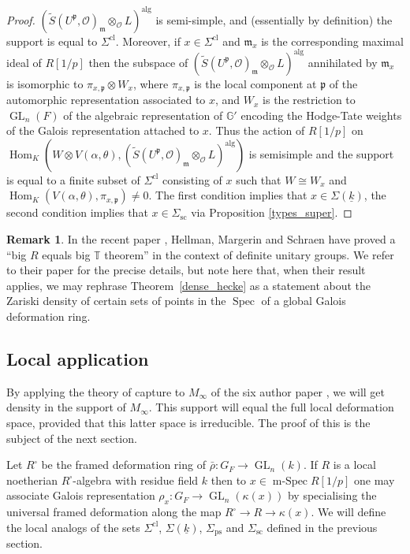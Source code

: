 \documentclass[JEP,XML,SOM,Unicode,NoEqCountersInSection]{cedram}
\let\mathcal\mathscr
\newcommand{\ssquare}{{\scriptscriptstyle\square}}
\newcommand{\rps}{\mathrm{ps}}
\newcommand{\rsc}{\mathrm{sc}}
\theoremstyle{definition}
\newtheorem{remark}[prop]{Remark}
\DeclareMathOperator{\Hom}{Hom}
\DeclareMathOperator{\GL}{GL}
\DeclareMathOperator{\Spec}{Spec}
\DeclareMathOperator{\mSpec}{m-Spec}
\newcommand{\mm}{\mathfrak m}
\newcommand{\cO}{\mathcal{O}}
\newcommand{\TT}{\mathbb T}
\newcommand{\pp}{\mathfrak p}
\newcommand{\alg}{\mathrm{alg}}
\newcommand{\rhobar}{\bar{\rho}}
\begin{document}
\begin{proof}
$(\tilde{S}(U^{\pp}, \cO)_{\mm}\otimes_{\cO} L)^\alg$ is semi-simple, and (essentially by definition) the support is equal to $\Sigma^{\mathrm{cl}}$.
Moreover, if $x\in \Sigma^{\mathrm{cl}}$ and $\mm_x$ is the corresponding maximal ideal of $R[1/p]$ then the subspace of $(\tilde{S}(U^{\pp}, \cO)_{\mm}\otimes_{\cO} L)^\alg$ annihilated by $\mm_x$ is isomorphic to $\pi_{x,\pp} \otimes W_x$, where
$\pi_{x,\pp}$ is the local component at $\pp$ of the automorphic representation associated to $x$, and $W_x$ is the restriction to $\GL_n(F)$ of the algebraic representation of $\mathbb{G}'$ encoding the Hodge-Tate weights of the Galois
representation attached to $x$. Thus the action of $R[1/p]$ on
$\Hom_K( W\otimes V(\alpha, \theta), (\tilde{S}(U^{\pp}, \cO)_{\mm}\otimes_{\cO} L)^\alg)$ is semisimple and the support is equal to a finite subset of $\Sigma^{\mathrm{cl}}$ consisting of $x$ such that $W\cong W_x$ and
$\Hom_K(V(\alpha, \theta), \pi_{x, \pp})\neq 0$. The first condition implies that
$x\in \Sigma(\underline{k})$, the second condition implies that $x\in \Sigma_{\rsc}$ via Proposition \ref{types_super}.
\end{proof}

\begin{remark}
In the recent paper \cite{HMS}, Hellman, Margerin and Schraen have proved
a ``big $R$ equals big $\TT$ theorem'' in the context of definite unitary groups.
We refer to their paper for the precise details, but note here that, when their
result applies, we may rephrase Theorem~\ref{dense_hecke} as a statement
about the Zariski density of certain sets of points in the $\Spec$
of a global Galois deformation ring.
\end{remark}

\subsection{Local application}
By applying the theory of capture to $M_{\infty}$
of the six author paper \cite{six-authors}, we will get density in the support
of $M_{\infty}$. This support will equal the full local
deformation space, provided that this latter space is irreducible.
The proof of this is the subject of the next section.

Let $R^\ssquare$ be the framed deformation ring of $\rhobar: G_F \to \GL_n(k)$. If $R$ is a local noetherian $R^\ssquare$-algebra
with residue field $k$
then to $x\in \mSpec R[1/p]$ one may associate Galois representation $\rho_x: G_F\to \GL_n(\kappa(x))$ by specialising the universal framed deformation along the map $R^\ssquare\to R\to \kappa(x)$. We will define the local analogs of the sets $\Sigma^{\mathrm{cl}}$,
$\Sigma(\underline{k})$, $\Sigma_{\rps}$ and $\Sigma_{\rsc}$ defined in the previous section.
\end{document}
